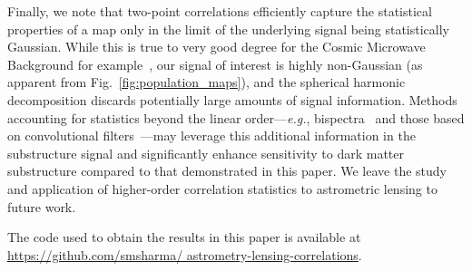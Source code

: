\documentclass[prd,aps,twocolumn,nofootinbib,superscriptaddress,preprintnumbers,balancelastpage,longbibliography,floatfix]{revtex4-1}
\begin{document}
Finally, we note that two-point correlations efficiently capture the statistical properties of a map only in the limit of the underlying signal being statistically Gaussian. While this is true to very good degree for the Cosmic Microwave Background for example~\cite{Akrami:2019izv}, our signal of interest is highly non-Gaussian (as apparent from Fig.~\ref{fig:population_maps}), and the spherical harmonic decomposition discards potentially large amounts of signal information. Methods accounting for statistics beyond the linear order---\emph{e.g.}, bispectra~\cite{Kamionkowski:2010me} and those based on convolutional filters~\cite{Krachmalnicoff:2019zjh,Perraudin:2018rbt}---may leverage this additional information in the substructure signal and significantly enhance sensitivity to dark matter substructure compared to that demonstrated in this paper. We leave the study and application of higher-order correlation statistics to astrometric lensing to future work.

The code used to obtain the results in this paper is available at \url{https://github.com/smsharma/
astrometry-lensing-correlations}.
\end{document}
